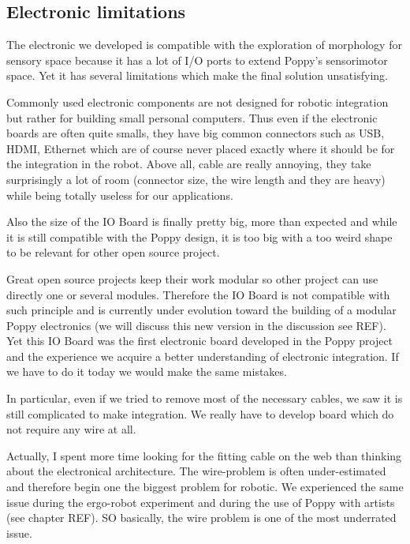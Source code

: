 \subsection{Electronic limitations} %

The electronic we developed is compatible with the exploration of morphology for sensory space because it has a lot of I/O ports to extend Poppy's sensorimotor space. Yet it has several limitations which make the final solution unsatisfying.

Commonly used electronic components are not designed for robotic integration but rather for building small personal computers. Thus even if the electronic boards are often quite smalls, they have big common connectors such as USB, HDMI, Ethernet which are of course never placed exactly where it should be for the integration in the robot.
Above all, cable are really annoying, they take surprisingly a lot of room (connector size, the wire length and they are heavy) while being totally useless for our applications.

Also the size of the IO Board is finally pretty big, more than expected and while it is still compatible with the Poppy design, it is too big with a too weird shape to be relevant for other open source project.

Great open source projects keep their work modular so other project can use directly one or several modules. Therefore the IO Board is not compatible with such principle and is currently under evolution toward the building of a modular Poppy electronics (we will discuss this new version in the discussion see REF). Yet this IO Board was the first electronic board developed in the Poppy project and the experience we acquire a better understanding of electronic integration. If we have to do it today we would make the same mistakes.

In particular, even if we tried to remove most of the necessary cables, we saw it is still complicated to make integration. We really have to develop board which do not require any wire at all.

Actually, I spent more time looking for the fitting cable on the web than thinking about the electronical architecture. The wire-problem is often under-estimated and therefore begin one the biggest problem for robotic. We experienced the same issue during the ergo-robot experiment and during the use of Poppy with artists (see chapter REF). SO basically, the wire problem is one of the most underrated issue.


